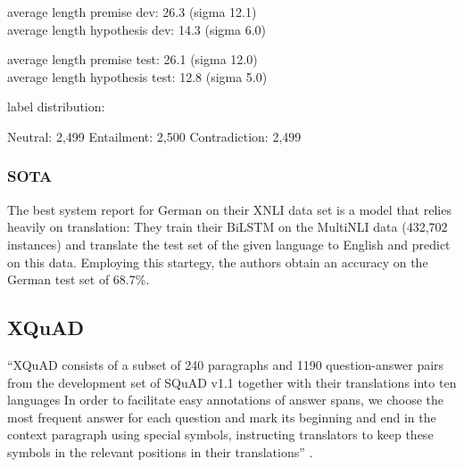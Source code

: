 average length premise dev: 26.3 (sigma 12.1) \\
average length hypothesis dev: 14.3 (sigma 6.0)

average length premise test: 26.1 (sigma 12.0) \\
average length hypothesis test: 12.8 (sigma 5.0)


label distribution:

Neutral: 2,499
Entailment: 2,500
Contradiction: 2,499


\subsubsection{SOTA}

The best system \cite{conneau2018xnli} report for German on their XNLI data set is a model that 
relies heavily on translation:
They train their BiLSTM on the MultiNLI data (432,702 instances) and translate the test set of the 
given language to English and predict on this data.
Employing this startegy, the authors obtain an accuracy on the German test set of 68.7\%.



\subsection{XQuAD}

``XQuAD consists of a subset of 240 paragraphs and 1190 question-answer pairs from the development 
set of SQuAD v1.1 together with their translations into ten languages \textelp{} In order to 
facilitate easy annotations of answer spans, we choose the most frequent answer for each question 
and mark its beginning and end in the context paragraph using special symbols, instructing 
translators to keep these symbols in the relevant positions in their translations'' 
\cite{artetxe2019cross}.

